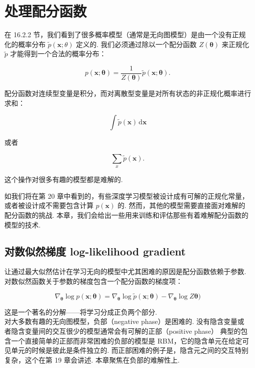 \chapter{处理配分函数}
\label{ch:partition}

在 16.2.2 节，我们看到了很多概率模型（通常是无向图模型）是由一个没有正规化的概率分布 $\tilde{p}(\mathbf{x};\theta)$ 定义的. 我们必须通过除以一个配分函数 $Z(\pmb{\theta})$ 来正规化 $\tilde{p}$ 才能得到一个合法的概率分布：

\begin{equation}  \label{eq:pyth}
p(\mathbf{x};\pmb{\theta}) = \frac{1}{Z(\pmb{\theta})} \tilde{p}(\mathbf{x}; \pmb{\theta}).
\end{equation}

配分函数对连续型变量是积分，而对离散型变量是对所有状态的非正规化概率进行求和：

\begin{equation}  \label{eq:pyth}
\int \!\tilde{p}(\pmb{x})\, \mathrm{d}\pmb{x}
\end{equation}

或者

\begin{equation}  \label{eq:pyth}
\sum_{x} \tilde{p}(\pmb{x}).
\end{equation}

这个操作对很多有趣的模型都是难解的. 

如我们将在第 20 章中看到的，有些深度学习模型被设计成有可解的正规化常量，或者被设计成不需要包含计算 $p(\mathbf{x})$ 的. 然而，其他的模型需要直接面对难解的配分函数的挑战. 本章，我们会给出一些用来训练和评估那些有着难解配分函数的模型的技术. 

\section{对数似然梯度 log-likelihood gradient}
\label{sec:llg}

让通过最大似然估计在学习无向的模型中尤其困难的原因是配分函数依赖于参数. 对数似然函数关于参数的梯度包含一个配分函数的梯度项：

\begin{equation}  \label{eq:pyth}
\nabla_{\pmb{\theta}} \log p(\mathbf{x};\pmb{\theta}) = \nabla_{\pmb{\theta}} \log \tilde{p}(\mathbf{x};\pmb{\theta}) - \nabla_{\pmb{\theta}} \log Z\pmb{\theta})
\end{equation}

这是一个著名的分解——将学习分成正负两个部分.\\

对大多数有趣的无向图模型，负部（negative phase）是困难的. 没有隐含变量或者隐含变量间的交互很少的模型通常会有可解的正部（positive phase） 典型的包含一个直接简单的正部而非常困难的负部的模型是 RBM，它的隐含单元在给定可见单元的时候是彼此是条件独立的. 而正部困难的例子是，隐含元之间的交互特别复杂，这个在第 19 章会讲述. 本章聚焦在负部的难解性上.\\

